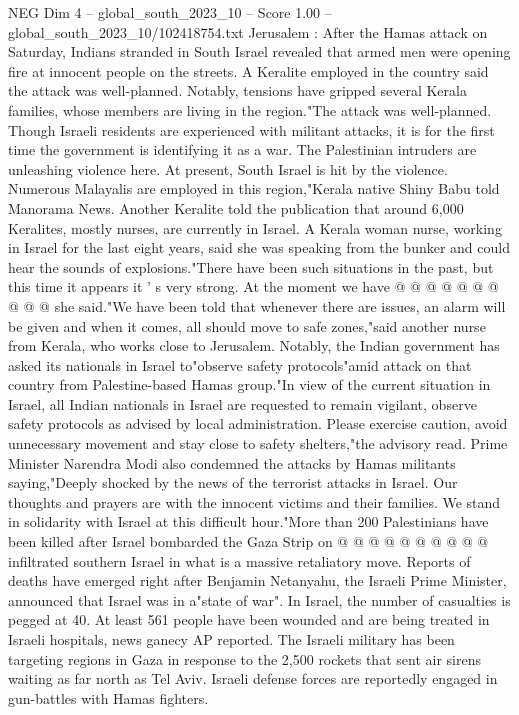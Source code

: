 \begin{textsample}{NEG Dim 4 – global\_south\_2023\_10 – Score 1.00 – global\_south\_2023\_10/102418754.txt}  \label{ex:f4_neg_039}
Jerusalem : After the Hamas attack on Saturday, Indians stranded in South Israel revealed that armed men were opening fire at innocent people on the streets.
A Keralite employed in the country said the attack was well-planned.
Notably, tensions have gripped several Kerala families, whose members are living in the region."The attack was well-planned.
Though Israeli residents are experienced with militant attacks, it is for the first time the government is identifying it as a war.
The Palestinian intruders are unleashing violence here.
At present, South Israel is hit by the violence.
Numerous Malayalis are employed in this region,"Kerala native Shiny Babu told Manorama News.
Another Keralite told the publication that around 6,000 Keralites, mostly nurses, are currently in Israel.
A Kerala woman nurse, working in Israel for the last eight years, said she was speaking from the bunker and could hear the sounds of explosions."There have been such situations in the past, but this time it appears it ' s very strong.
At the moment we have @ @ @ @ @ @ @ @ @ @ she said."We have been told that whenever there are issues, an alarm will be given and when it comes, all should move to safe zones,"said another nurse from Kerala, who works close to Jerusalem.
Notably, the Indian government has asked its nationals in Israel to"observe safety protocols"amid attack on that country from Palestine-based Hamas group."In view of the current situation in Israel, all Indian nationals in Israel are requested to remain vigilant, observe safety protocols as advised by local administration.
Please exercise caution, avoid unnecessary movement and stay close to safety shelters,"the advisory read.
Prime Minister Narendra Modi also condemned the attacks by Hamas militants saying,"Deeply shocked by the news of the terrorist attacks in Israel.
Our thoughts and prayers are with the innocent victims and their families.
We stand in solidarity with Israel at this difficult hour."More than 200 Palestinians have been killed after Israel bombarded the Gaza Strip on @ @ @ @ @ @ @ @ @ @ infiltrated southern Israel in what is a massive retaliatory move.
Reports of deaths have emerged right after Benjamin Netanyahu, the Israeli Prime Minister, announced that Israel was in a"state of war".
In Israel, the number of casualties is pegged at 40.
At least 561 people have been wounded and are being treated in Israeli hospitals, news ganecy AP reported.
The Israeli military has been targeting regions in Gaza in response to the 2,500 rockets that sent air sirens waiting as far north as Tel Aviv.
Israeli defense forces are reportedly engaged in gun-battles with Hamas fighters.

\end{textsample}
